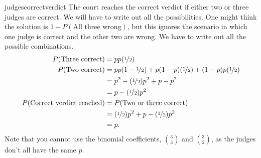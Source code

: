 \begin{answer}{judgescorrectverdict}
The court reaches the correct verdict if either two or three judges are correct.
We will have to write out all the possibilities.
One might think the solution is $1 - P(\text{All three wrong})$, but this ignores the scenario in which one judge is correct and the other two are wrong.
We have to write out all the possible combinations.
\begin{align*}
  P(\text{Three correct})  &= p p  (\nicefrac{1}{2}) \\
  P( \text{Two correct} ) &=
     p         p     (1-\nicefrac{1}{2}) +
     p       (1-p)   (\nicefrac{1}{2}) +
   (1-p)       p     (\nicefrac{1}{2}) \\
  &= p^2 - (\nicefrac{1}{2})p^2 + p-p^2 \\
  &= p - (\nicefrac{1}{2})p^2  \\
   P(\text{Correct verdict reached})
  &=
   P(\text{Two or three correct}) \\
  &= (\nicefrac{1}{2})p^2   + p - (\nicefrac{1}{2})p^2  \\
  &=  p
  \text{.}
\end{align*}
Note that you cannot use the binomial coefficients,
$\binom{3}{3}$
and
$\binom{3}{2}$,
as the judges don't all have the same $p$.
\end{answer}
